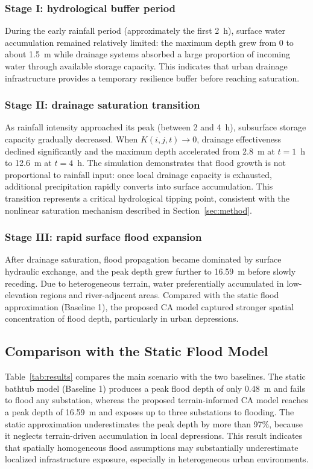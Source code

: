 \documentclass[preprint,12pt]{elsarticle}
\begin{document}
\subsubsection{Stage I: hydrological buffer period}
During the early rainfall period (approximately the first 2~h), surface
water accumulation remained relatively limited: the maximum depth grew from
0 to about 1.5~m while drainage systems absorbed a large proportion of
incoming water through available storage capacity. This indicates that urban
drainage infrastructure provides a temporary resilience buffer before
reaching saturation.

\subsubsection{Stage II: drainage saturation transition}
As rainfall intensity approached its peak (between 2 and 4~h), subsurface
storage capacity gradually decreased. When $K(i,j,t) \rightarrow 0$, drainage
effectiveness declined significantly and the maximum depth accelerated from
2.8~m at $t=1$~h to 12.6~m at $t=4$~h. The simulation demonstrates that
flood growth is not proportional to rainfall input: once local drainage
capacity is exhausted, additional precipitation rapidly converts into
surface accumulation. This transition represents a critical hydrological
tipping point, consistent with the nonlinear saturation mechanism described
in Section~\ref{sec:method}.

\subsubsection{Stage III: rapid surface flood expansion}
After drainage saturation, flood propagation became dominated by surface
hydraulic exchange, and the peak depth grew further to 16.59~m before slowly
receding. Due to heterogeneous terrain, water preferentially accumulated in
low-elevation regions and river-adjacent areas. Compared with the static
flood approximation (Baseline 1), the proposed CA model captured stronger
spatial concentration of flood depth, particularly in urban depressions.

\subsection{Comparison with the Static Flood Model}
Table~\ref{tab:results} compares the main scenario with the two baselines.
The static bathtub model (Baseline 1) produces a peak flood depth of only
0.48~m and fails to flood any substation, whereas the proposed terrain-informed
CA model reaches a peak depth of 16.59~m and exposes up to three substations to
flooding. The static approximation underestimates the peak depth by more than
97\%, because it neglects terrain-driven accumulation in local depressions.
This result indicates that spatially homogeneous flood assumptions may
substantially underestimate localized infrastructure exposure, especially in
heterogeneous urban environments.
\end{document}
